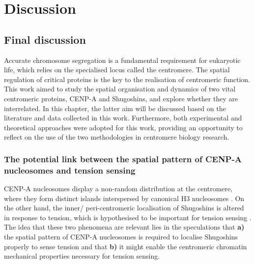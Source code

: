 \chapter{Discussion}

\section{Final discussion}

Accurate chromosome segregation is a fundamental requirement for eukaryotic life, which relies on the specialised locus called the centromere. The spatial regulation of critical proteins is the key to the realisation of centromeric function. This work aimed to study the spatial organisation and dynamics of two vital centromeric proteins, CENP-A and Shugoshins, and explore whether they are interrelated. In this chapter, the latter aim will be discussed based on the literature and data collected in this work. Furthermore, both experimental and theoretical approaches were adopted for this work, providing an opportunity to reflect on the use of the two methodologies in centromere biology research. 

\subsection{The potential link between the spatial pattern of CENP-A nucleosomes and tension sensing}

CENP-A nucleosomes display a non-random distribution at the centromere, where they form distinct islands interspersed by canonical H3 nucleosomes \citep{Blower2002ConservedHumans, Dunleavy2011H3.3Phase., Kyriacou2018}. On the other hand, the inner/ peri-centromeric localisation of Shugoshins is altered in response to tension, which is hypothesised to be important for tension sensing \citep{Huang2007, Liu2013, Asai2020, Lee2008, Gomez2007, Eshleman2014, Nerusheva2014, Paldi2020ConvergentPericentromeres, Clarke2005, Kawashima2007}. The idea that these two phenomena are relevant lies in the speculations that \textbf{a)} the spatial pattern of CENP-A nucleosomes is required to localise Shugoshins properly to sense tension and that \textbf{b)} it might enable the centromeric chromatin mechanical properties necessary for tension sensing. 

